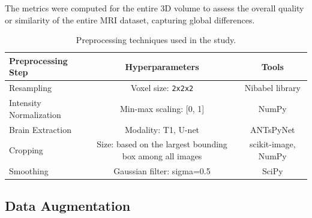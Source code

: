 The metrics were computed for the entire 3D volume to assess the overall quality or similarity of the entire MRI dataset, capturing global differences.
\begin{center}
    \begin{table}
        \centering
        \caption{\label{tab:preprocessing_pipeline}Preprocessing techniques used in the study.}
        \begin{tabular*}{500pt}{@{\extracolsep\fill}lcc@{\extracolsep\fill}}
            \toprule
            \textbf{Preprocessing Step} & \textbf{Hyperparameters} & \textbf{Tools} \\
            \midrule
            Resampling & Voxel size: \texttt{2x2x2} & Nibabel library \\
            Intensity Normalization & Min-max scaling: [0, 1] & NumPy \\
            Brain Extraction & Modality: T1, U-net & ANTsPyNet \\
            Cropping & Size: based on the largest bounding box among all images & scikit-image, NumPy \\
            Smoothing & Gaussian filter: sigma=0.5 & SciPy \\
            \bottomrule
            \end{tabular*}
    \end{table}
\end{center}
%
\subsection{Data Augmentation}

